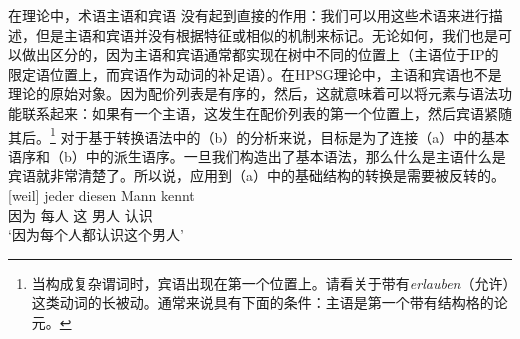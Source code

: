 在\gb 理论中，术语主语和宾语 没有起到直接的作用：我们可以用这些术语来进行描述，但是主语和宾语并没有根据特征或相似的机制来标记。无论如何，我们也是可以做出区分的，因为主语和宾语通常都实现在树中不同的位置上（主语位于IP的限定语位置上，而宾语作为动词的补足语）。在HPSG理论中，主语和宾语也不是理论的原始对象。因为配价列表是有序的，然后，这就意味着可以将\argst 元素与语法功能联系起来：如果有一个主语，这发生在配价列表的第一个位置上，然后宾语紧随其后。\footnote{
当构成复杂谓词时，宾语出现在第一个位置上。请看关于带有\emph{erlauben}（允许）这类动词的长被动。通常来说具有下面的条件：主语是第一个带有结构格的论元。
} 
对于基于转换语法中的（b）的分析来说，目标是为了连接（a）中的基本语序和（b）中的派生语序。一旦我们构造出了基本语法，那么什么是主语什么是宾语就非常清楚了。所以说，应用到（a）中的基础结构的转换是需要被反转的。
\eal
\ex 
\gll {}[weil] jeder diesen Mann kennt\\
	 {}\spacebr{}因为 每人 这 男人 认识\\
\glt `因为每个人都认识这个男人'
